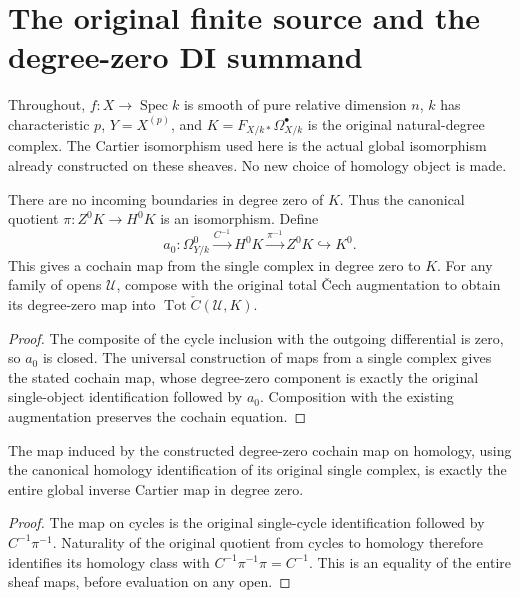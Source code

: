 \section{The original finite source and the degree-zero DI summand}
\label{sec:di-finite-source-assembly}

Throughout, $f:X\to\operatorname{Spec}k$ is smooth of pure relative
dimension $n$, $k$ has characteristic $p$, $Y=X^{(p)}$, and
$K=F_{X/k*}\Omega^\bullet_{X/k}$ is the original natural-degree complex.
The Cartier isomorphism used here is the actual global isomorphism already
constructed on these sheaves. No new choice of homology object is made.

\begin{definition}
\label{def:di-actual-zero-summand}
\leanok
{}
There are no incoming boundaries in degree zero of $K$. Thus the canonical
quotient $\pi:Z^0K\to H^0K$ is an isomorphism. Define
\[
 a_0:\Omega^0_{Y/k}\xrightarrow{C^{-1}}H^0K
       \xrightarrow{\pi^{-1}}Z^0K\hookrightarrow K^0.
\]
This gives a cochain map from the single complex in degree zero to $K$.
For any family of opens $\mathcal U$, compose with the original total
\v Cech augmentation to obtain its degree-zero map into
$\operatorname{Tot}\check C(\mathcal U,K)$.
\end{definition}
\begin{proof}
The composite of the cycle inclusion with the outgoing differential is
zero, so $a_0$ is closed. The universal construction of maps from a single
complex gives the stated cochain map, whose degree-zero component is
exactly the original single-object identification followed by $a_0$.
Composition with the existing augmentation preserves the cochain equation.
\end{proof}

\begin{lemma}
\label{lem:di-actual-zero-cartier-class}
\leanok
{}
The map induced by the constructed degree-zero cochain map on homology,
using the canonical homology identification of its original single
complex, is exactly the entire global inverse Cartier map in degree zero.
\end{lemma}
\begin{proof}
The map on cycles is the original single-cycle identification followed by
$C^{-1}\pi^{-1}$. Naturality of the original quotient from cycles to
homology therefore identifies its homology class with
$C^{-1}\pi^{-1}\pi=C^{-1}$. This is an equality of the entire sheaf maps,
before evaluation on any open.
\end{proof}

